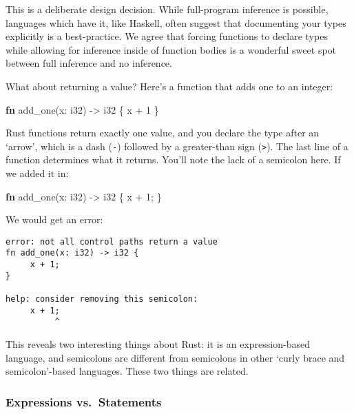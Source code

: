 \documentclass[a4paper,]{book}
\newenvironment{Shaded}{\begin{snugshade}}{\end{snugshade}}
\newcommand{\KeywordTok}[1]{\textcolor[rgb]{0.13,0.29,0.53}{\textbf{{#1}}}}
\newcommand{\DataTypeTok}[1]{\textcolor[rgb]{0.13,0.29,0.53}{{#1}}}
\newcommand{\DecValTok}[1]{\textcolor[rgb]{0.00,0.00,0.81}{{#1}}}
\newcommand{\NormalTok}[1]{{#1}}
\begin{document}
This is a deliberate design decision. While full-program inference is
possible, languages which have it, like Haskell, often suggest that
documenting your types explicitly is a best-practice. We agree that
forcing functions to declare types while allowing for inference inside
of function bodies is a wonderful sweet spot between full inference and
no inference.

What about returning a value? Here's a function that adds one to an
integer:

\begin{Shaded}
\begin{Highlighting}[]
\KeywordTok{fn} \NormalTok{add_one(x: }\DataTypeTok{i32}\NormalTok{) -> }\DataTypeTok{i32} \NormalTok{\{}
    \NormalTok{x + }\DecValTok{1}
\NormalTok{\}}
\end{Highlighting}
\end{Shaded}

Rust functions return exactly one value, and you declare the type after
an `arrow', which is a dash (\texttt{-}) followed by a greater-than sign
(\texttt{\textgreater{}}). The last line of a function determines what
it returns. You'll note the lack of a semicolon here. If we added it in:

\begin{Shaded}
\begin{Highlighting}[]
\KeywordTok{fn} \NormalTok{add_one(x: }\DataTypeTok{i32}\NormalTok{) -> }\DataTypeTok{i32} \NormalTok{\{}
    \NormalTok{x + }\DecValTok{1}\NormalTok{;}
\NormalTok{\}}
\end{Highlighting}
\end{Shaded}

We would get an error:

\begin{verbatim}
error: not all control paths return a value
fn add_one(x: i32) -> i32 {
     x + 1;
}

help: consider removing this semicolon:
     x + 1;
          ^
\end{verbatim}

This reveals two interesting things about Rust: it is an
expression-based language, and semicolons are different from semicolons
in other `curly brace and semicolon'-based languages. These two things
are related.

\subsubsection{Expressions
vs.~Statements}\label{expressions-vs.statements}
\end{document}
